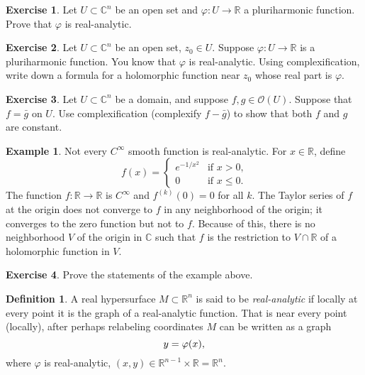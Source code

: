 \documentclass[12pt,openany]{book}
\newcommand{\avoidbreak}{\postdisplaypenalty=100}
\newcommand{\C}{{\mathbb{C}}}
\newcommand{\R}{{\mathbb{R}}}
\newcommand{\sO}{{\mathscr{O}}}
\theoremstyle{plain}
\theoremstyle{remark}
\theoremstyle{definition}
\newtheorem{defn}[thm]{Definition}
\newenvironment{exbox}{%
    \def\FrameCommand{\vrule width 1pt \relax\hspace{10pt}}%
    \MakeFramed{\advance\hsize-\width\FrameRestore}%
}{%
    \endMakeFramed
}
\theoremstyle{exercise}
\newtheorem{exercise}{Exercise}[section]
\theoremstyle{example}
\newtheorem{example}[thm]{Example}
\begin{document}
\begin{exbox}
\begin{exercise}
Let $U \subset \C^n$ be an open set and $\varphi \colon U \to \R$ a
pluriharmonic function.  Prove that $\varphi$ is real-analytic.
\end{exercise}

\begin{exercise}
Let $U \subset \C^n$ be an open set, $z_0 \in U$.
Suppose $\varphi \colon U \to \R$ is a pluriharmonic function.
You know that $\varphi$ is real-analytic.
Using complexification, write down a formula for a holomorphic function near
$z_0$ whose real part is $\varphi$.
\end{exercise}

\begin{exercise}
Let $U \subset \C^n$ be a domain, and suppose $f, g \in \sO(U)$.
Suppose that $f = \bar{g}$ on $U$.  Use complexification (complexify
$f-\bar{g}$) to show that both $f$ and $g$ are constant.
\end{exercise}
\end{exbox}

\begin{example}
Not every $C^\infty$ smooth function is real-analytic.  For $x \in \R$,
define
\begin{equation*}
f(x) =
\begin{cases}
e^{-1/x^2} & \text{if $x > 0$,} \\
0 & \text{if $x \leq 0$.}
\end{cases}
\end{equation*}
The function
$f \colon \R \to \R$ is $C^\infty$ and $f^{(k)}(0) = 0$ for all $k$.
The Taylor series of $f$ at the origin does
not converge to $f$ in any neighborhood of the origin; it converges to the
zero function but not to $f$.
Because of this, there is no neighborhood $V$ of the origin in $\C$ such that
$f$ is the restriction to $V \cap \R$ of a holomorphic function in $V$.
\end{example}

\begin{exbox}
\begin{exercise}
Prove the statements of the example above.
\end{exercise}
\end{exbox}

\begin{defn}
A real hypersurface $M \subset \R^n$ is said to be
\emph{real-analytic}
if locally at every point it is the graph of a real-analytic function.  That
is near every point (locally), after perhaps relabeling coordinates $M$ can be written as
a graph
\begin{equation*}
y = \varphi(x) ,
\avoidbreak
\end{equation*}
where $\varphi$ is real-analytic, $(x,y) \in \R^{n-1} \times \R = \R^n$.
\end{defn}
\end{document}
